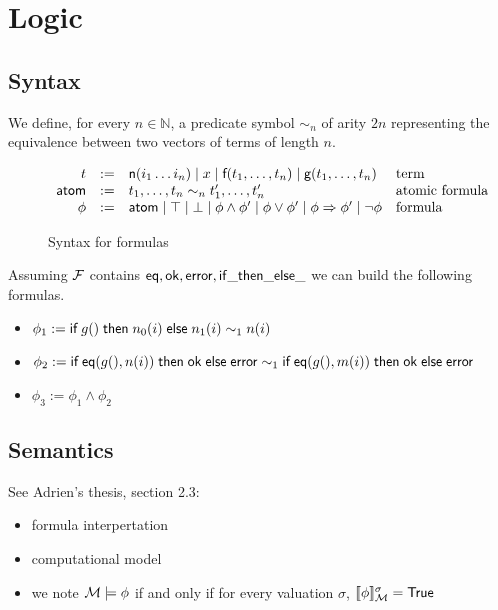 \section{Logic}

\subsection{Syntax}

We define, for every $n \in \mathbb{N}$, a predicate symbol $\sim_n$ of arity $2n$ representing the equivalence between two vectors of terms of length $n$.

\begin{figure}[h]
  \[
    \begin{array}{rcll}
      t & := & \textsf{n}(i_1 \dots i_n) \mid x \mid \textsf{f}(t_1,\dots,t_n) \mid \textsf{g}(t_1,\dots,t_n) & \text{term}
      \\
      \textsf{atom} & := & t_1,\dots,t_n \sim_n t'_1,\dots,t'_n & \text{atomic formula}
      \\
      \phi & := & \textsf{atom} \mid \top \mid \bot \mid \phi \wedge \phi' \mid \phi \vee \phi' \mid \phi \Rightarrow \phi'\mid \neg \phi & \text{formula}
    \end{array}
  \]
  \caption{Syntax for formulas}
  \label{fig:syntax-formula}
\end{figure}

\begin{example}
  Assuming $\mathcal{F}$ contains $\mathsf{eq}, \mathsf{ok}, \mathsf{error}, \mathsf{if\_then\_else\_}$ we can build the following formulas.
  \begin{itemize}
    \item $\phi_1 := \textsf{if}\; g() \;\textsf{then}\; n_0(i) \;\textsf{else}\; n_1(i) \sim_1 n(i)$
    \item $\phi_2 := \textsf{if}\; \mathsf{eq}(g(),n(i)) \;\textsf{then}\; \mathsf{ok} \;\textsf{else}\; \mathsf{error} \sim_1 \textsf{if}\; \mathsf{eq}(g(),m(i)) \;\textsf{then}\; \mathsf{ok} \;\textsf{else}\; \mathsf{error}$
    \item $\phi_3 := \phi_1 \land \phi_2$
  \end{itemize}
\end{example}

\subsection{Semantics}

See Adrien's thesis, section 2.3:
\begin{itemize}
  \item formula interpertation
  \item computational model
  \item we note $\mathcal{M} \models \phi$ if and only if for every valuation $\sigma$, $\llbracket \phi \rrbracket_{\mathcal{M}}^\sigma = \textsf{True}$
\end{itemize}
